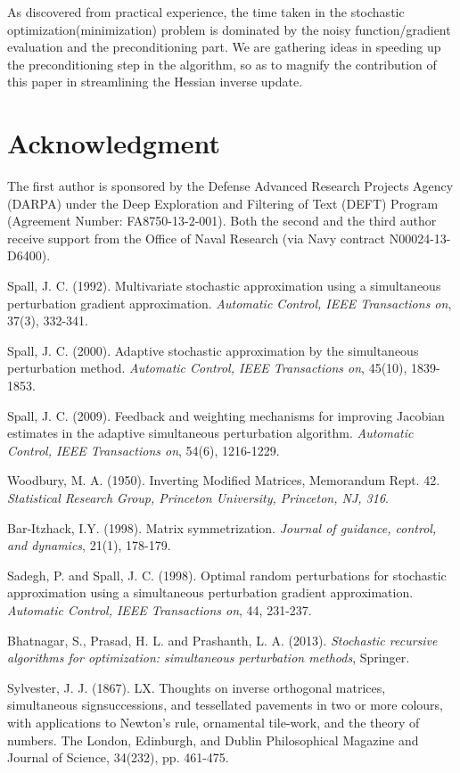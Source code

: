 \documentclass[conference]{IEEEtran} \ifCLASSINFOpdf
\begin{document}
As discovered from practical experience, the time taken in the
stochastic optimization(minimization) problem is dominated by the
noisy function/gradient evaluation and the preconditioning part. We
are gathering ideas in speeding up the preconditioning step in the
algorithm, so as to magnify the contribution of this paper in
streamlining the Hessian inverse update.

\section*{Acknowledgment} The first author is sponsored by the
Defense Advanced Research Projects Agency (DARPA) under the Deep
Exploration and Filtering of Text (DEFT) Program (Agreement Number:
FA8750-13-2-001). Both the second and the third author receive
support from the Office of Naval Research (via Navy contract
N00024-13-D6400).

\begin{thebibliography}{1}

 Spall, J. C. (1992). Multivariate
  stochastic approximation using a simultaneous perturbation gradient
  approximation. \textit{Automatic Control, IEEE Transactions on},
  37(3), 332-341.

 Spall, J. C. (2000). Adaptive
  stochastic approximation by the simultaneous perturbation
  method. \textit{Automatic Control, IEEE Transactions on}, 45(10),
  1839-1853.

 Spall, J. C. (2009). Feedback and
  weighting mechanisms for improving Jacobian estimates in the adaptive
  simultaneous perturbation algorithm. \textit{Automatic Control, IEEE
    Transactions on}, 54(6), 1216-1229.

 Woodbury,
  M. A. (1950). Inverting Modified Matrices, Memorandum
  Rept. 42. \textit{Statistical Research Group, Princeton University,
    Princeton, NJ, 316}.

 Bar-Itzhack,
  I.Y. (1998). Matrix symmetrization. \textit{Journal of guidance,
    control, and dynamics}, 21(1), 178-179.


 Sadegh, P. and Spall,
  J. C. (1998). Optimal random perturbations for stochastic
  approximation using a simultaneous perturbation gradient
  approximation. \textit{Automatic Control, IEEE Transactions on}, 44,
  231-237.

 Bhatnagar, S., Prasad,
  H. L. and Prashanth, L. A. (2013). \textit{Stochastic recursive
    algorithms for optimization: simultaneous perturbation methods},
  Springer.

 Sylvester,
  J. J. (1867). LX. Thoughts on inverse orthogonal matrices,
  simultaneous signsuccessions, and tessellated pavements in two or more
  colours, with applications to Newton's rule, ornamental tile-work, and
  the theory of numbers. The London, Edinburgh, and Dublin Philosophical
  Magazine and Journal of Science, 34(232), pp. 461-475.

\end{thebibliography}
\end{document}
